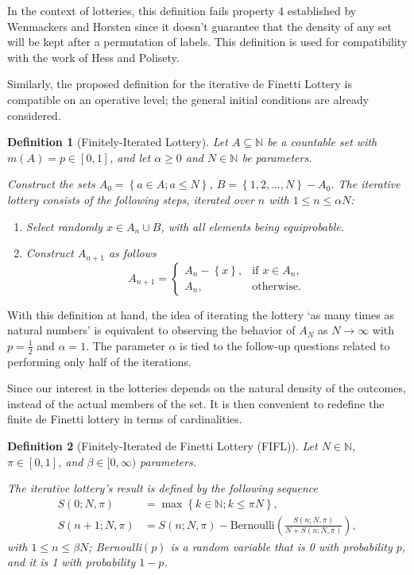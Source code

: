 \documentclass{article}
\newtheorem{definition}{Definition}
\newcommand{\N}{\mathbb{N}}
\newcommand{\sset}[1]{\left\{ #1 \right\}}
\newcommand{\ppar}[1]{\left( #1 \right)}
\begin{document}
In the context of lotteries, this definition fails property 4 established by Wenmackers and Horsten since it doesn't guarantee that the density of any set will be kept after a permutation of labels.
%
This definition is used for compatibility with the work of Hess and Polisety.

Similarly, the proposed definition for the iterative de Finetti Lottery is compatible on an operative level; the general initial conditions are already considered.

\begin{definition}[Finitely-Iterated Lottery]
Let $A \subseteq \N$ be a countable set with $m\ppar{A} = p \in [0,1]$, and let $\alpha\geq 0$ and $N\in \N$ be parameters. 

Construct the sets $A_0 = \sset{a\in A; a\leq N}$, $B = \sset{1, 2, \dots, N} - A_0$.
%
The iterative lottery consists of the following steps, iterated over $n$ with $1\leq n\leq \alpha N$:
\begin{enumerate}
    \item Select randomly $x \in A_n \cup B$, with all elements being equiprobable.
    \item Construct $A_{n+1}$ as follows
    \begin{equation}
        A_{n+1} = \begin{cases}
            A_n-\sset{x}, &\text{if } x\in A_n, \\
            A_n, &\text{otherwise}.
        \end{cases}
    \end{equation}
\end{enumerate}
\end{definition}

With this definition at hand, the idea of iterating the lottery `as many times as natural numbers' is equivalent to observing the behavior of $A_{N}$ as $N \rightarrow \infty$ with $p=\frac{1}{2}$ and $\alpha=1$.
%
The parameter $\alpha$ is tied to the follow-up questions related to performing only half of the iterations.


Since our interest in the lotteries depends on the natural density of the outcomes, instead of the actual members of the set.
%
It is then convenient to redefine the finite de Finetti lottery in terms of cardinalities.

\begin{definition}[Finitely-Iterated de Finetti Lottery (FIFL)]
Let $N\in \N$, $\pi \in [0,1]$, and $\beta \in [0, \infty)$ parameters.

The iterative lottery's result is defined by the following sequence
\begin{align}
    S\ppar{0; N, \pi} &= \max\sset{k\in \N; k \leq \pi N}, \\
    S\ppar{n+1; N, \pi} &= S\ppar{n; N, \pi} - \text{Bernoulli}\ppar{\frac{S\ppar{n; N, \pi}}{N+S\ppar{n; N, \pi}}},
\end{align}
with $1\leq n\leq \beta N$; Bernoulli$\ppar{p}$ is a random variable that is 0 with probability $p$, and it is 1 with probability $1-p$.
\end{definition}
\end{document}
